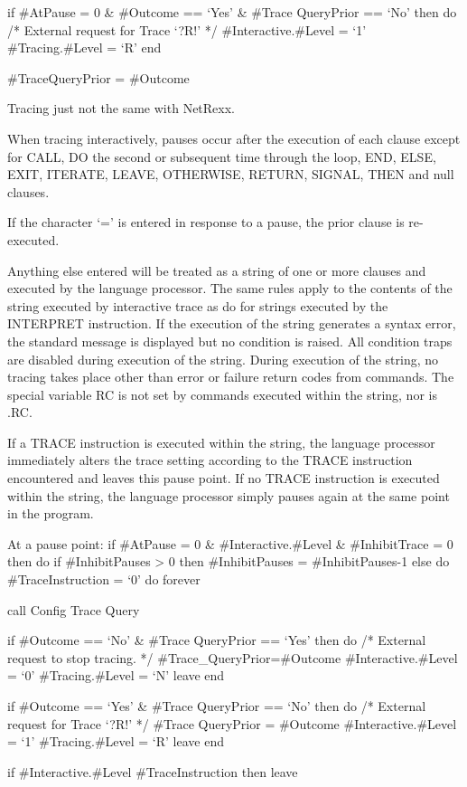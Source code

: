 if \#AtPause = 0 \& \#Outcome == `Yes' \& \#Trace QueryPrior == `No'
then do /* External request for Trace `?R!' */ \#Interactive.\#Level =
`1' \#Tracing.\#Level = `R' end

\#TraceQueryPrior = \#Outcome

Tracing just not the same with NetRexx.

When tracing interactively, pauses occur after the execution of each
clause except for CALL, DO the second or subsequent time through the
loop, END, ELSE, EXIT, ITERATE, LEAVE, OTHERWISE, RETURN, SIGNAL, THEN
and null clauses.

If the character `=' is entered in response to a pause, the prior clause
is re-executed.

Anything else entered will be treated as a string of one or more clauses
and executed by the language processor. The same rules apply to the
contents of the string executed by interactive trace as do for strings
executed by the INTERPRET instruction. If the execution of the string
generates a syntax error, the standard message is displayed but no
condition is raised. All condition traps are disabled during execution
of the string. During execution of the string, no tracing takes place
other than error or failure return codes from commands. The special
variable RC is not set by commands executed within the string, nor is
.RC.

If a TRACE instruction is executed within the string, the language
processor immediately alters the trace setting according to the TRACE
instruction encountered and leaves this pause point. If no TRACE
instruction is executed within the string, the language processor simply
pauses again at the same point in the program.

At a pause point: if \#AtPause = 0 \& \#Interactive.\#Level \&
\#InhibitTrace = 0 then do if \#InhibitPauses \textgreater{} 0 then
\#InhibitPauses = \#InhibitPauses-1 else do \#TraceInstruction = `0' do
forever

call Config Trace Query

if \#Outcome == `No' \& \#Trace QueryPrior == `Yes' then do /* External
request to stop tracing. */ \#Trace\_QueryPrior=\#Outcome
\#Interactive.\#Level = `0' \#Tracing.\#Level = `N' leave end

if \#Outcome == `Yes' \& \#Trace QueryPrior == `No' then do /* External
request for Trace `?R!' */ \#Trace QueryPrior = \#Outcome
\#Interactive.\#Level = `1' \#Tracing.\#Level = `R' leave end

if \#Interactive.\#Level \textbar{} \#TraceInstruction then leave

